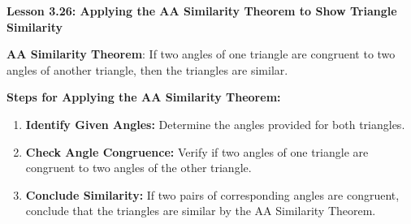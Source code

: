 \begin{center}
\textbf{Lesson 3.26: Applying the AA Similarity Theorem to Show Triangle Similarity}
\end{center}

\vspace*{-1.5ex}

\noindent\textbf{AA Similarity Theorem}: If two angles of one triangle are congruent to two angles of another triangle, then the triangles are similar.

\noindent \textbf{Steps for Applying the AA Similarity Theorem:}
\begin{enumerate}
    \item \textbf{Identify Given Angles:} Determine the angles provided for both triangles.
    \item \textbf{Check Angle Congruence:} Verify if two angles of one triangle are congruent to two angles of the other triangle.
    \item \textbf{Conclude Similarity:} If two pairs of corresponding angles are congruent, conclude that the triangles are similar by the AA Similarity Theorem.
\end{enumerate}

